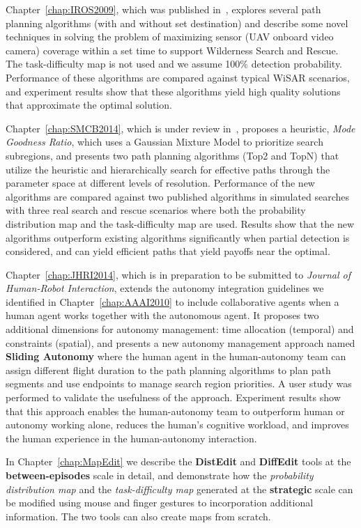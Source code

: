 Chapter~\ref{chap:IROS2009}, which was published in~\cite{Lin2009UAV}, explores several path planning algorithms (with and without set destination) and describe some novel techniques in solving the problem of maximizing sensor (UAV onboard video camera) coverage within a set time to support Wilderness Search and Rescue. The task-difficulty map is not used and we assume 100\% detection probability. Performance of these algorithms are compared against typical WiSAR scenarios, and experiment results show that these algorithms yield high quality solutions that approximate the optimal solution.

Chapter~\ref{chap:SMCB2014}, which is under review in~\cite{Lin2014Hierarchical}, proposes a heuristic, \textit{Mode Goodness Ratio}, which uses a Gaussian Mixture Model to prioritize search subregions, and presents two path planning algorithms (Top2 and TopN) that utilize the heuristic and hierarchically search for effective paths through the parameter space at different levels of resolution. Performance of the new algorithms are compared against two published algorithms in simulated searches with three real search and rescue scenarios where both the probability distribution map and the task-difficulty map are used. Results show that the new algorithms outperform existing algorithms significantly when partial detection is considered, and can yield efficient paths that yield payoffs near the optimal. 

Chapter~\ref{chap:JHRI2014}, which is in preparation to be submitted to \textit{Journal of Human-Robot Interaction}, extends the autonomy integration guidelines we identified in Chapter~\ref{chap:AAAI2010} to include collaborative agents when a human agent works together with the autonomous agent. It proposes two additional dimensions for autonomy management: time allocation (temporal) and constraints (spatial), and presents a new autonomy management approach named \textbf{Sliding Autonomy} where the human agent in the human-autonomy team can assign different flight duration to the path planning algorithms to plan path segments and use endpoints to manage search region priorities. A user study was performed to validate the usefulness of the approach. Experiment results show that this approach enables the human-autonomy team to outperform human or autonomy working alone, reduces the human's cognitive workload, and improves the human experience in the human-autonomy interaction.

In Chapter~\ref{chap:MapEdit} we describe the \textbf{DistEdit} and \textbf{DiffEdit} tools at the \textbf{between-episodes} scale in detail, and demonstrate how the \textit{probability distribution map} and the \textit{task-difficulty map} generated at the \textbf{strategic} scale can be modified using mouse and finger gestures to incorporation additional information. The two tools can also create maps from scratch.

